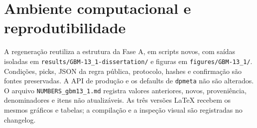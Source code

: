 \section{Ambiente computacional e reprodutibilidade}
\label{sec:ambiente}

A regeneração reutiliza a estrutura da Fase A, em scripts novos, com saídas isoladas em \texttt{results/GBM-13\_1-dissertation/} e figuras em \texttt{figures/GBM-13\_1/}. Condições, picks, JSON da regra pública, protocolo, hashes e confirmação são fontes preservadas. A API de produção e os defaults de \texttt{dpmeta} não são alterados. O arquivo \texttt{NUMBERS\_gbm13\_1.md} registra valores anteriores, novos, proveniência, denominadores e itens não atualizáveis. As três versões LaTeX recebem os mesmos gráficos e tabelas; a compilação e a inspeção visual são registradas no changelog.

